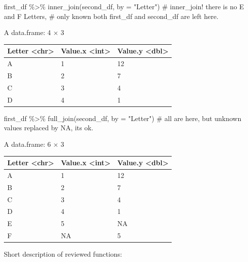 \documentclass[
  letterpaper,
  DIV=11,
  numbers=noendperiod]{scrreprt}
\newenvironment{Shaded}{\begin{snugshade}}{\end{snugshade}}
\newcommand{\AttributeTok}[1]{\textcolor[rgb]{0.40,0.45,0.13}{#1}}
\newcommand{\CommentTok}[1]{\textcolor[rgb]{0.37,0.37,0.37}{#1}}
\newcommand{\FunctionTok}[1]{\textcolor[rgb]{0.28,0.35,0.67}{#1}}
\newcommand{\NormalTok}[1]{\textcolor[rgb]{0.00,0.23,0.31}{#1}}
\newcommand{\SpecialCharTok}[1]{\textcolor[rgb]{0.37,0.37,0.37}{#1}}
\newcommand{\StringTok}[1]{\textcolor[rgb]{0.13,0.47,0.30}{#1}}
\begin{document}
\begin{Shaded}
\begin{Highlighting}[]
\NormalTok{first\_df }\SpecialCharTok{\%\textgreater{}\%} 
    \FunctionTok{inner\_join}\NormalTok{(second\_df, }\AttributeTok{by =} \StringTok{"Letter"}\NormalTok{)}
\CommentTok{\# inner\_join! there is no E and F Letters, }
\CommentTok{\# only known both first\_df and second\_df are left here.}
\end{Highlighting}
\end{Shaded}

A data.frame: 4 × 3

\begin{longtable}[]{@{}lll@{}}
\toprule\noalign{}
Letter \textless chr\textgreater{} & Value.x \textless int\textgreater{}
& Value.y \textless dbl\textgreater{} \\
\midrule\noalign{}
\endhead
\bottomrule\noalign{}
\endlastfoot
A & 1 & 12 \\
B & 2 & 7 \\
C & 3 & 4 \\
D & 4 & 1 \\
\end{longtable}

\begin{Shaded}
\begin{Highlighting}[]
\NormalTok{first\_df }\SpecialCharTok{\%\textgreater{}\%} 
    \FunctionTok{full\_join}\NormalTok{(second\_df, }\AttributeTok{by =} \StringTok{"Letter"}\NormalTok{)}
\CommentTok{\# all are here, but unknown values replaced by NA, it\textquotesingle{}s ok.}
\end{Highlighting}
\end{Shaded}

A data.frame: 6 × 3

\begin{longtable}[]{@{}lll@{}}
\toprule\noalign{}
Letter \textless chr\textgreater{} & Value.x \textless int\textgreater{}
& Value.y \textless dbl\textgreater{} \\
\midrule\noalign{}
\endhead
\bottomrule\noalign{}
\endlastfoot
A & 1 & 12 \\
B & 2 & 7 \\
C & 3 & 4 \\
D & 4 & 1 \\
E & 5 & NA \\
F & NA & 5 \\
\end{longtable}

Short description of reviewed functions:
\end{document}
